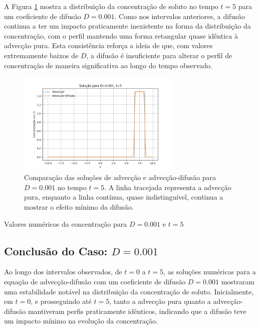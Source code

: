 A Figura \ref{fig:advec_diffus_0.001_t5} mostra a distribuição da concentração de soluto no tempo \( t = 5 \) para um coeficiente de difusão \( D = 0.001 \). Como nos intervalos anteriores, a difusão continua a ter um impacto praticamente inexistente na forma da distribuição da concentração, com o perfil mantendo uma forma retangular quase idêntica à advecção pura. Esta consistência reforça a ideia de que, com valores extremamente baixos de \( D \), a difusão é insuficiente para alterar o perfil de concentração de maneira significativa ao longo do tempo observado.

\begin{figure}[H]
    \centering
    \includegraphics[width=0.7\textwidth]{code/plot/Advec_Difus_t5_D0.001.png}
    \caption{Comparação das soluções de advecção e advecção-difusão para \( D = 0.001 \) no tempo \( t = 5 \). A linha tracejada representa a advecção pura, enquanto a linha contínua, quase indistinguível, continua a mostrar o efeito mínimo da difusão.}
    \label{fig:advec_diffus_0.001_t5}
\end{figure}

\begin{table}[H]
    \centering
    \caption{Valores numéricos da concentração para \( D = 0.001 \) e \( t = 5 \)}
    
\end{table}


\subsection{Conclusão do Caso: \( D = 0.001 \)}
Ao longo dos intervalos observados, de \( t = 0 \) a \( t = 5 \), as soluções numéricas para a equação de advecção-difusão com um coeficiente de difusão \( D = 0.001 \) mostraram uma estabilidade notável na distribuição da concentração de soluto. Inicialmente, em \( t = 0 \), e prosseguindo até \( t = 5 \), tanto a advecção pura quanto a advecção-difusão mantiveram perfis praticamente idênticos, indicando que a difusão teve um impacto mínimo na evolução da concentração.

